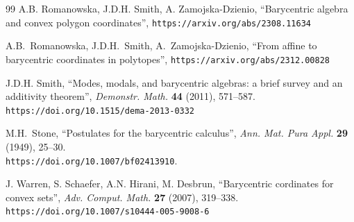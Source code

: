 \documentclass[12pt]{amsart}
\theoremstyle{plain}
\theoremstyle{definition}
\numberwithin{equation}{section}
\begin{document}
\begin{thebibliography}{99}
A.B. Romanowska, J.D.H. Smith, A. Zamojska-Dzienio, ``{Barycentric algebra and convex polygon coordinates}'',  \texttt{https://arxiv.org/abs/2308.11634}

A.B.~Romanowska, J.D.H.~Smith, A.~Zamojska-Dzienio, ``{From affine to barycentric coordinates in polytopes}'', \texttt{https://arxiv.org/abs/2312.00828}

J.D.H. Smith,
``{Modes, modals, and barycentric algebras: a brief survey and an additivity theorem}'',
\textit{Demonstr. Math.} \textbf{44} (2011), 571--587.\\
\texttt{https://doi.org/10.1515/dema-2013-0332}

 M.H.~Stone, ``{Postulates for the barycentric calculus}'', \textit{Ann. Mat. Pura Appl.} \textbf{29} (1949), 25--30.\\
 \texttt{https://doi.org/10.1007/bf02413910}.

J. Warren, S. Schaefer, A.N. Hirani, M. Desbrun,
``{Barycentric cordinates for convex sets}'',
\textit{Adv. Comput. Math.} \textbf{27} (2007), 319--338.\\
\texttt{https://doi.org/10.1007/s10444-005-9008-6}

\end{thebibliography}
\end{document}
